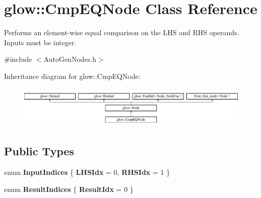 \hypertarget{classglow_1_1_cmp_e_q_node}{}\section{glow\+:\+:Cmp\+E\+Q\+Node Class Reference}
\label{classglow_1_1_cmp_e_q_node}


Performs an element-\/wise equal comparison on the L\+HS and R\+HS operands. Inputs must be integer.  




{\ttfamily \#include $<$Auto\+Gen\+Nodes.\+h$>$}

Inheritance diagram for glow\+:\+:Cmp\+E\+Q\+Node\+:\begin{figure}[H]
\begin{center}
\leavevmode
\includegraphics[height=2.028986cm]{classglow_1_1_cmp_e_q_node}
\end{center}
\end{figure}
\subsection*{Public Types}
\begin{DoxyCompactItemize}
\item 
\mbox{\label{classglow_1_1_cmp_e_q_node_a1533fb6688aaf665a2c627fd92d84f88}} 
enum {\bfseries Input\+Indices} \{ {\bfseries L\+H\+S\+Idx} = 0, 
{\bfseries R\+H\+S\+Idx} = 1
 \}
\item 
\mbox{\label{classglow_1_1_cmp_e_q_node_af9c4dc9d306308ef24aa3afddb8af6c3}} 
enum {\bfseries Result\+Indices} \{ {\bfseries Result\+Idx} = 0
 \}
\end{DoxyCompactItemize}
